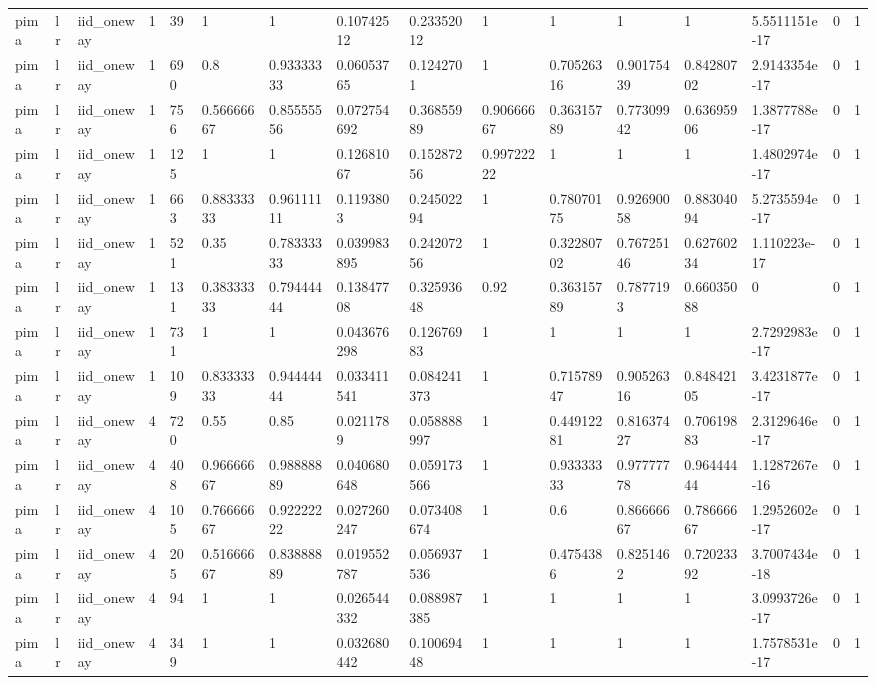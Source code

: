 \begin{tabular}{llllllllllllllll}
pima & lr & iid\_oneway & 1 & 39 & 1 & 1 & 0.10742512 & 0.23352012 & 1 & 1 & 1 & 1 & 5.5511151e-17 & 0 & 1 \\
pima & lr & iid\_oneway & 1 & 690 & 0.8 & 0.93333333 & 0.06053765 & 0.1242701 & 1 & 0.70526316 & 0.90175439 & 0.84280702 & 2.9143354e-17 & 0 & 1 \\
pima & lr & iid\_oneway & 1 & 756 & 0.56666667 & 0.85555556 & 0.072754692 & 0.36855989 & 0.90666667 & 0.36315789 & 0.77309942 & 0.63695906 & 1.3877788e-17 & 0 & 1 \\
pima & lr & iid\_oneway & 1 & 125 & 1 & 1 & 0.12681067 & 0.15287256 & 0.99722222 & 1 & 1 & 1 & 1.4802974e-17 & 0 & 1 \\
pima & lr & iid\_oneway & 1 & 663 & 0.88333333 & 0.96111111 & 0.1193803 & 0.24502294 & 1 & 0.78070175 & 0.92690058 & 0.88304094 & 5.2735594e-17 & 0 & 1 \\
pima & lr & iid\_oneway & 1 & 521 & 0.35 & 0.78333333 & 0.039983895 & 0.24207256 & 1 & 0.32280702 & 0.76725146 & 0.62760234 & 1.110223e-17 & 0 & 1 \\
pima & lr & iid\_oneway & 1 & 131 & 0.38333333 & 0.79444444 & 0.13847708 & 0.32593648 & 0.92 & 0.36315789 & 0.7877193 & 0.66035088 & 0 & 0 & 1 \\
pima & lr & iid\_oneway & 1 & 731 & 1 & 1 & 0.043676298 & 0.12676983 & 1 & 1 & 1 & 1 & 2.7292983e-17 & 0 & 1 \\
pima & lr & iid\_oneway & 1 & 109 & 0.83333333 & 0.94444444 & 0.033411541 & 0.084241373 & 1 & 0.71578947 & 0.90526316 & 0.84842105 & 3.4231877e-17 & 0 & 1 \\
pima & lr & iid\_oneway & 4 & 720 & 0.55 & 0.85 & 0.0211789 & 0.058888997 & 1 & 0.44912281 & 0.81637427 & 0.70619883 & 2.3129646e-17 & 0 & 1 \\
pima & lr & iid\_oneway & 4 & 408 & 0.96666667 & 0.98888889 & 0.040680648 & 0.059173566 & 1 & 0.93333333 & 0.97777778 & 0.96444444 & 1.1287267e-16 & 0 & 1 \\
pima & lr & iid\_oneway & 4 & 105 & 0.76666667 & 0.92222222 & 0.027260247 & 0.073408674 & 1 & 0.6 & 0.86666667 & 0.78666667 & 1.2952602e-17 & 0 & 1 \\
pima & lr & iid\_oneway & 4 & 205 & 0.51666667 & 0.83888889 & 0.019552787 & 0.056937536 & 1 & 0.4754386 & 0.8251462 & 0.72023392 & 3.7007434e-18 & 0 & 1 \\
pima & lr & iid\_oneway & 4 & 94 & 1 & 1 & 0.026544332 & 0.088987385 & 1 & 1 & 1 & 1 & 3.0993726e-17 & 0 & 1 \\
pima & lr & iid\_oneway & 4 & 349 & 1 & 1 & 0.032680442 & 0.10069448 & 1 & 1 & 1 & 1 & 1.7578531e-17 & 0 & 1 \\

\end{tabular}
